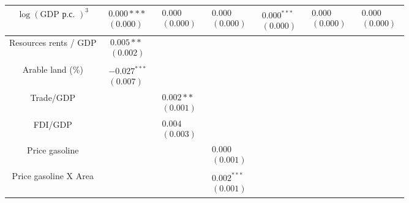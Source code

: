 \documentclass[10pt]{article}
\begin{document}
\begin{center}
\begin{tabular}{|c|c|c|c|c|c|c|}
$\log (\mathrm{GDP} \text { р.с. })^{3}$ & $\begin{array}{l}0.000 * * * \\ (0.000)\end{array}$ & $\begin{array}{l}0.000 \\ (0.000)\end{array}$ & $\begin{array}{l}0.000 \\ (0.000)\end{array}$ & $\begin{array}{l}0.000^{* * *} \\ (0.000)\end{array}$ & $\begin{array}{l}0.000 \\ (0.000)\end{array}$ & $\begin{array}{l}0.000 \\ (0.000)\end{array}$ \\
\hline
Resources rents / GDP & $\begin{array}{l}0.005 * * \\ (0.002)\end{array}$ &  &  &  &  &  \\
\hline
Arable land (\%) & $\begin{array}{l}-0.027^{* * *} \\ (0.007)\end{array}$ &  &  &  &  &  \\
\hline
Trade/GDP &  & $\begin{array}{l}0.002 * * \\ (0.001)\end{array}$ &  &  &  &  \\
\hline
FDI/GDP &  & $\begin{array}{l}0.004 \\ (0.003)\end{array}$ &  &  &  &  \\
\hline
Price gasoline &  &  & $\begin{array}{l}0.000 \\ (0.001)\end{array}$ &  &  &  \\
\hline
Price gasoline X Area &  &  & $\begin{array}{l}0.002^{* * *} \\ (0.001)\end{array}$ &  &  &  \\

\end{tabular}
\end{center}
\end{document}
